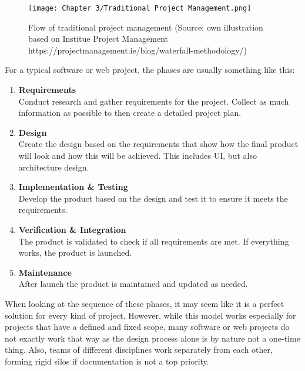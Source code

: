 \begin{figure}[H]
      \centering
      \texttt{[image: Chapter 3/Traditional Project Management.png]}
      \caption{Flow of traditional project management (Source: own illustration based on Institue Project Management https://projectmanagement.ie/blog/waterfall-methodology/)}
\end{figure}
For a typical software or web project, the phases are usually something like this: %
\begin{enumerate}
      \item \textbf{Requirements}\\
            Conduct research and gather requirements for the project. Collect as much information 
            as possible to then create a detailed project
            plan. 
      \item \textbf{Design}\\
            Create the design based on the requirements that show how the final product will look
            and how this will be achieved. This includes UI, but also architecture design.
      \item \textbf{Implementation \& Testing}\\
            Develop the product based on the design and test it to ensure it meets the
            requirements.  
      \item \textbf{Verification \& Integration}\\
            The product is validated to check if all requirements are met. If everything works,
            the product is launched.
      \item \textbf{Maintenance}\\
            After launch the product is maintained and updated as needed.
\end{enumerate}

When looking at the sequence of these phases, it may seem like it is a perfect solution for every kind
of project. However, while this model works especially for projects that have a defined and fixed
scope, many software or web projects do not exactly work that way as the design process alone is by
nature not a one-time thing. Also, teams of different disciplines work separately from each other,
forming rigid silos if documentation is not a top priority.

